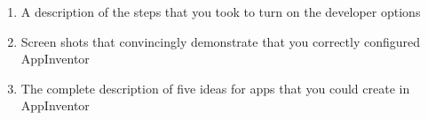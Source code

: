 \begin{enumerate}
	\itemsep0em
	\item A description of the steps that you took to turn on the developer options
	\item Screen shots that convincingly demonstrate that you correctly configured AppInventor
	\item The complete description of five ideas for apps that you could create in AppInventor
\end{enumerate}

% 
% 		
% 
% 
% 
% 
% 

